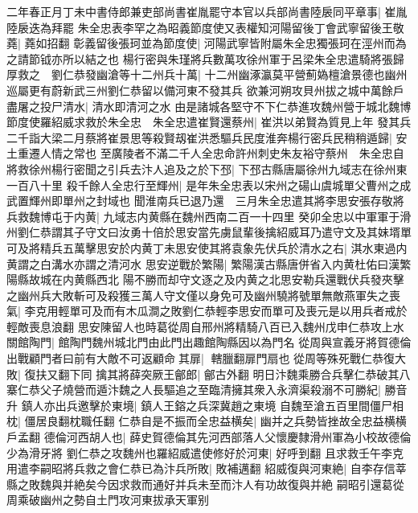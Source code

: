 二年春正月丁未中書侍郎兼吏部尚書崔胤罷守本官以兵部尚書陸扆同平章事|{
	崔胤陸扆迭為拜罷}
朱全忠表李罕之為昭義節度使又表權知河陽留後丁會武寧留後王敬蕘|{
	蕘如招翻}
彰義留後張珂並為節度使|{
	河陽武寧皆附屬朱全忠獨張珂在涇州而為之請節钺亦所以結之也}
楊行密與朱瑾將兵數萬攻徐州軍于呂梁朱全忠遣騎將張歸厚救之　劉仁恭發幽滄等十二州兵十萬|{
	十二州幽涿瀛莫平營薊媯檀滄景德也幽州巡屬更有蔚新武三州劉仁恭留以備河東不發其兵}
欲兼河朔攻貝州拔之城中萬餘戶盡屠之投尸清水|{
	清水即清河之水}
由是諸城各堅守不下仁恭進攻魏州營于城北魏博節度使羅紹威求救於朱全忠　朱全忠遣崔賢還蔡州|{
	崔洪以弟賢為質見上年}
發其兵二千詣大梁二月蔡將崔景思等殺賢刼崔洪悉驅兵民度淮奔楊行密兵民稍稍遁歸|{
	安土重遷人情之常也}
至廣陵者不滿二千人全忠命許州刺史朱友裕守蔡州　朱全忠自將救徐州楊行密聞之引兵去汴人追及之於下邳|{
	下邳古縣唐屬徐州九域志在徐州東一百八十里}
殺千餘人全忠行至輝州|{
	是年朱全忠表以宋州之碭山虞城單父曹州之成武置輝州即單州之封域也}
聞淮南兵已退乃還　三月朱全忠遣其將李思安張存敬將兵救魏博屯于内黄|{
	九域志内黄縣在魏州西南二百一十四里}
癸卯全忠以中軍軍于滑州劉仁恭謂其子守文曰汝勇十倍於思安當先虜鼠輩後擒紹威耳乃遣守文及其妹壻單可及將精兵五萬擊思安於内黄丁未思安使其將袁象先伏兵於清水之右|{
	淇水東過内黄謂之白溝水亦謂之清河水}
思安逆戰於繁陽|{
	繁陽漢古縣唐併省入内黄杜佑曰漢繁陽縣故城在内黄縣西北}
陽不勝而却守文逐之及内黄之北思安勒兵還戰伏兵發夾擊之幽州兵大敗斬可及殺獲三萬人守文僅以身免可及幽州驍將號單無敵燕軍失之喪氣|{
	李克用輕單可及而有木瓜澗之敗劉仁恭輕李思安而單可及喪元是以用兵者戒於輕敵喪息浪翻}
思安陳留人也時葛從周自邢州將精騎八百已入魏州戊申仁恭攻上水關館陶門|{
	館陶門魏州城北門由此門出趣館陶縣因以為門名}
從周與宣義牙將賀德倫出戰顧門者曰前有大敵不可返顧命其扉|{
	轄臘翻扉門扇也}
從周等殊死戰仁恭復大敗|{
	復扶又翻下同}
擒其將薛突厥王鄶郎|{
	鄶古外翻}
明日汴魏乘勝合兵擊仁恭破其八寨仁恭父子燒營而遁汴魏之人長驅追之至臨清擁其衆入永濟渠殺溺不可勝紀|{
	勝音升}
鎮人亦出兵邀擊於東境|{
	鎮人王鎔之兵深冀趙之東境}
自魏至滄五百里間僵尸相枕|{
	僵居良翻枕職任翻}
仁恭自是不振而全忠益横矣|{
	幽并之兵勢皆挫故全忠益横横戶孟翻}
德倫河西胡人也|{
	薛史賀德倫其先河西部落人父懷慶隸滑州軍為小校故德倫少為滑牙將}
劉仁恭之攻魏州也羅紹威遣使修好於河東|{
	好呼到翻}
且求救壬午李克用遣李嗣昭將兵救之會仁恭已為汴兵所敗|{
	敗補邁翻}
紹威復與河東絶|{
	自李存信莘縣之敗魏與并絶矣今因求救而通好并兵未至而汴人有功故復與并絶}
嗣昭引還葛從周乘破幽州之勢自土門攻河東拔承天軍别

